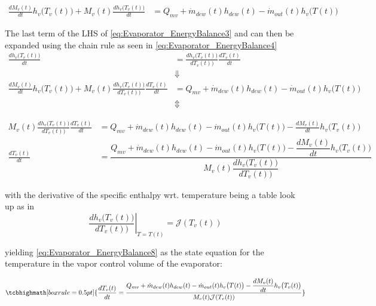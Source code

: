 \begin{align}
	\frac{ dM_{v}(t)}{dt} h_v\bigl(T_v(t)\bigr) + M_{v}(t) \frac{ dh_v \bigl(T_v(t)\bigr)}{dt}  & = Q_{mv} + \dot{m}_{dew}(t)h_{dew}(t) - \dot{m}_{out}(t)h_v\bigl(T(t)\bigr)		\label{eq:Evaporator_EnergyBalance3}
\end{align}

The last term of the LHS of \cref{eq:Evaporator_EnergyBalance3} and can then be expanded using the chain rule as seen in \cref{eq:Evaporator_EnergyBalance4}
\begin{align}
	\frac{ dh_v \bigl(T_v(t)\bigr)}{dt}  & = \frac{ dh_v \bigl(T_v(t)\bigr)}{dT_v(t))} \frac{dT_v(t)}{dt}	\label{eq:Evaporator_EnergyBalance4} \\
	& \Downarrow \\
	\frac{dM_{v}(t)}{dt} h_v\bigl(T_v(t)\bigr) + M_{v}(t) \frac{ dh_v \bigl(T_v(t)\bigr)}{dT_v(t))} \frac{dT_v(t)}{dt}  & = Q_{mv} + \dot{m}_{dew}(t)h_{dew}(t) - \dot{m}_{out}(t)h_v\bigl(T(t)\bigr)	\\
	& \Updownarrow
\end{align}


\begin{align}
	 M_{v}(t) \frac{ dh_v \bigl(T_v(t)\bigr)}{dT_v(t))} \frac{dT_v(t)}{dt}  & = Q_{mv} + \dot{m}_{dew}(t)h_{dew}(t) - \dot{m}_{out}(t)h_v\bigl(T(t)\bigr) - \frac{dM_{v}(t)}{dt} h_v\bigl(T_v(t)\bigr)  \label{eq:Evaporator_EnergyBalance5} \\
	 \frac{dT_v(t)}{dt}  & = \dfrac{Q_{mv} + \dot{m}_{dew}(t)h_{dew}(t) - \dot{m}_{out}(t)h_v\bigl(T(t)\bigr) - \dfrac{dM_{v}(t)}{dt} h_v\bigl(T_v(t)\bigr)}{M_{v}(t) \dfrac{ dh_v \bigl(T_v(t)\bigr)}{dT_v(t))} }  \label{eq:Evaporator_EnergyBalance6}
\end{align}

with the derivative of the specific enthalpy wrt. temperature being a table look up as in
\begin{equation}
	\left. \dfrac{ dh_v \bigl(T_v(t)\bigr)}{dT_v(t))} \right |_{T = T(t)}= \mathcal{J}(T_v(t)) \label{eq:Evaporator_EnergyBalance7}
\end{equation}

yielding \cref{eq:Evaporator_EnergyBalance8} as the state equation for the temperature in the vapor control volume of the evaporator:

\begin{equation}
	\tcbhighmath[boxrule = 0.5pt]{\frac{dT_v(t)}{dt}  = \dfrac{Q_{mv} + \dot{m}_{dew}(t)h_{dew}(t) - \dot{m}_{out}(t)h_v\bigl(T(t)\bigr) - \dfrac{dM_{v}(t)}{dt} h_v\bigl(T_v(t)\bigr)}{M_{v}(t) \mathcal{J}(T_v(t)) } } \label{eq:Evaporator_EnergyBalance8}
\end{equation}



